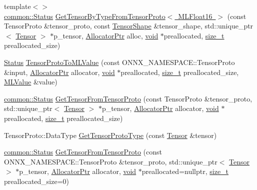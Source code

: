 \begin{DoxyCompactItemize}
\item 
{\footnotesize template$<$$>$ }\\\mbox{\hyperlink{classonnxruntime_1_1common_1_1Status}{common\+::\+Status}} \mbox{\hyperlink{namespaceonnxruntime_1_1utils_a969c0e118d0d6c6ef5d023abadaad937}{Get\+Tensor\+By\+Type\+From\+Tensor\+Proto$<$ M\+L\+Float16 $>$}} (const Tensor\+Proto \&tensor\+\_\+proto, const \mbox{\hyperlink{classonnxruntime_1_1TensorShape}{Tensor\+Shape}} \&tensor\+\_\+shape, std\+::unique\+\_\+ptr$<$ \mbox{\hyperlink{classonnxruntime_1_1Tensor}{Tensor}} $>$ $\ast$p\+\_\+tensor, \mbox{\hyperlink{namespaceonnxruntime_a6cdac724c5dcefded3a63f08dae58fda}{Allocator\+Ptr}} alloc, \mbox{\hyperlink{mlasi_8h_a88f941d423cb2a819b70a1358982b1a6}{void}} $\ast$preallocated, \mbox{\hyperlink{mlasi_8h_a503efbc1c6e50825320ad909366b78ab}{size\+\_\+t}} preallocated\+\_\+size)
\item 
\mbox{\hyperlink{classonnxruntime_1_1common_1_1Status}{Status}} \mbox{\hyperlink{namespaceonnxruntime_1_1utils_af3f247a91aa48e3f4c056314b0c69501}{Tensor\+Proto\+To\+M\+L\+Value}} (const O\+N\+N\+X\+\_\+\+N\+A\+M\+E\+S\+P\+A\+C\+E\+::\+Tensor\+Proto \&input, \mbox{\hyperlink{namespaceonnxruntime_a6cdac724c5dcefded3a63f08dae58fda}{Allocator\+Ptr}} allocator, \mbox{\hyperlink{mlasi_8h_a88f941d423cb2a819b70a1358982b1a6}{void}} $\ast$preallocated, \mbox{\hyperlink{mlasi_8h_a503efbc1c6e50825320ad909366b78ab}{size\+\_\+t}} preallocated\+\_\+size, \mbox{\hyperlink{classonnxruntime_1_1MLValue}{M\+L\+Value}} \&value)
\item 
\mbox{\hyperlink{classonnxruntime_1_1common_1_1Status}{common\+::\+Status}} \mbox{\hyperlink{namespaceonnxruntime_1_1utils_a37c9ecf5c17ff148a413861223e1b450}{Get\+Tensor\+From\+Tensor\+Proto}} (const Tensor\+Proto \&tensor\+\_\+proto, std\+::unique\+\_\+ptr$<$ \mbox{\hyperlink{classonnxruntime_1_1Tensor}{Tensor}} $>$ $\ast$p\+\_\+tensor, \mbox{\hyperlink{namespaceonnxruntime_a6cdac724c5dcefded3a63f08dae58fda}{Allocator\+Ptr}} allocator, \mbox{\hyperlink{mlasi_8h_a88f941d423cb2a819b70a1358982b1a6}{void}} $\ast$preallocated, \mbox{\hyperlink{mlasi_8h_a503efbc1c6e50825320ad909366b78ab}{size\+\_\+t}} preallocated\+\_\+size)
\item 
Tensor\+Proto\+::\+Data\+Type \mbox{\hyperlink{namespaceonnxruntime_1_1utils_a58bc30bc1665255748d3e98960193ab2}{Get\+Tensor\+Proto\+Type}} (const \mbox{\hyperlink{classonnxruntime_1_1Tensor}{Tensor}} \&tensor)
\item 
\mbox{\hyperlink{classonnxruntime_1_1common_1_1Status}{common\+::\+Status}} \mbox{\hyperlink{namespaceonnxruntime_1_1utils_a39b6f54f084a54bef83148d27bc50e30}{Get\+Tensor\+From\+Tensor\+Proto}} (const O\+N\+N\+X\+\_\+\+N\+A\+M\+E\+S\+P\+A\+C\+E\+::\+Tensor\+Proto \&tensor\+\_\+proto, std\+::unique\+\_\+ptr$<$ \mbox{\hyperlink{classonnxruntime_1_1Tensor}{Tensor}} $>$ $\ast$p\+\_\+tensor, \mbox{\hyperlink{namespaceonnxruntime_a6cdac724c5dcefded3a63f08dae58fda}{Allocator\+Ptr}} allocator, \mbox{\hyperlink{mlasi_8h_a88f941d423cb2a819b70a1358982b1a6}{void}} $\ast$preallocated=nullptr, \mbox{\hyperlink{mlasi_8h_a503efbc1c6e50825320ad909366b78ab}{size\+\_\+t}} preallocated\+\_\+size=0)

\end{DoxyCompactItemize}
